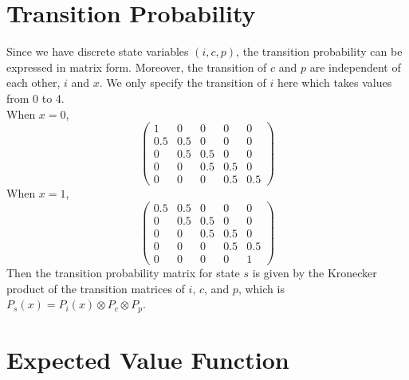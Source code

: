 \documentclass[12pt]{article}[margin=1in]
\begin{document}
\section{Transition Probability}
Since we have discrete state variables $(i,c,p)$, the transition probability
can be expressed in matrix form. Moreover, the transition of $c$ and $p$ are
independent of each other, $i$ and $x$. We only specify the transition of $i$
here which takes values from 0 to 4. \\ When $x = 0$,
\begin{equation}\label{eq:trans0}
    \begin{pmatrix}
        1   & 0   & 0   & 0   & 0   \\
        0.5 & 0.5 & 0   & 0   & 0   \\
        0   & 0.5 & 0.5 & 0   & 0   \\
        0   & 0   & 0.5 & 0.5 & 0   \\
        0   & 0   & 0   & 0.5 & 0.5
    \end{pmatrix}
\end{equation}
When $x = 1$,
\begin{equation}\label{eq:trans1}
    \begin{pmatrix}
        0.5 & 0.5 & 0   & 0   & 0   \\
        0   & 0.5 & 0.5 & 0   & 0   \\
        0   & 0   & 0.5 & 0.5 & 0   \\
        0   & 0   & 0   & 0.5 & 0.5 \\
        0   & 0   & 0   & 0   & 1
    \end{pmatrix}
\end{equation}
Then the transition probability matrix for state $s$ is given by the Kronecker product of the transition matrices of $i$, $c$, and $p$, which is $P_s(x) = P_i(x) \otimes P_c \otimes P_p$.
\section{Expected Value Function}
\end{document}
